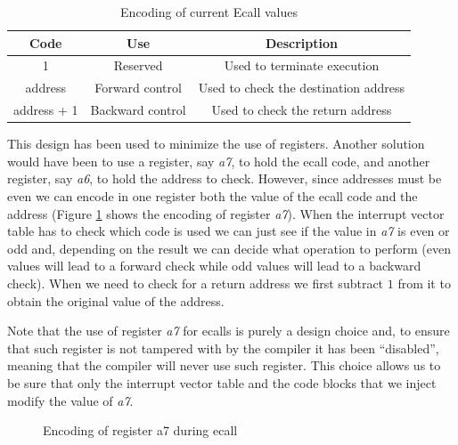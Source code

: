 \begin{table}
  \centering
  \begin{tabular}{|c|c|c|}
    \hline
    \textbf{Code} & \textbf{Use}     & \textbf{Description}                  \\
    \hline
    1             & Reserved         & Used to terminate execution           \\
    \hline
    address       & Forward control  & Used to check the destination address \\
    \hline
    address + 1   & Backward control & Used to check the return address      \\
    \hline
  \end{tabular}
  \caption{Encoding of current Ecall values}
  \label{tab:ecalls}
\end{table}

This design has been used to minimize the use of registers. Another solution
would have been to use a register, say \textit{a7}, to hold the ecall code, and
another register, say \textit{a6}, to hold the address to check. However, since addresses
must be even we can encode in one register both the value of the ecall code and the
address (Figure \ref{fig:ecall} shows the encoding of register \textit{a7}). When
the interrupt vector table has to check which code is used we can just see if the
value in \textit{a7} is even or odd and, depending on the result we can decide what
operation to perform (even values will lead to a forward check while odd values
will lead to a backward check). When we need to check for a return address we
first subtract $1$ from it to obtain the original value of the address.

Note that the use of register \textit{a7} for ecalls is purely a design choice and,
to ensure that such register is not tampered with by the compiler it has been ``disabled'',
meaning that the compiler will never use such register. This choice allows us to
be sure that only the interrupt vector table and the code blocks that we inject
modify the value of \textit{a7}.

\begin{figure}[htbp]
  \centering
  \def\stackalignment{r} %
  {\scriptsize }
  \caption{Encoding of register a7 during ecall}
  \label{fig:ecall}
\end{figure}

